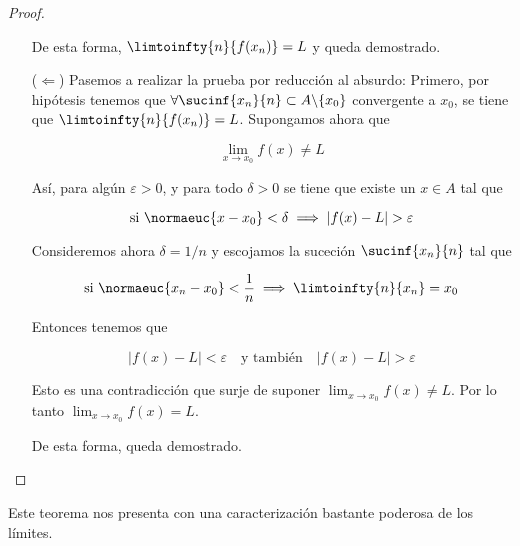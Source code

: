 \begin{proof}
\begin{itemize}
        De esta forma, $\limtoinfty{n}{f(x_n)} = L$ y queda demostrado.
        
        \item[($\Leftarrow$)] Pasemos a realizar la prueba por reducción al absurdo: Primero, por hipótesis tenemos que $\forall \sucinf{x_n}{n} \subset A \backslash \{x_0\}$ convergente a $x_0$, se tiene que $\limtoinfty{n}{f(x_n)} = L$. Supongamos ahora que
        
        \[
        \lim_{x \to x_0} f(x) \neq L
        \]
        
        Así, para algún $\varepsilon > 0$, y para todo $\delta > 0$ se tiene que existe un $x \in A$ tal que
        
        \[
        \text{si $\normaeuc{x - x_0} < \delta$} \implies |f(x) - L| > \varepsilon
        \]
        
        Consideremos ahora $\delta = 1/n$ y escojamos la suceción $\sucinf{x_n}{n}$ tal que
        
        \[
        \text{si $\normaeuc{x_n - x_0} < \frac{1}{n}$} \implies \limtoinfty{n}{x_n} = x_0
        \]
        
        Entonces tenemos que
        
        \[
        |f(x) - L| < \varepsilon \quad \text{y también} \quad |f(x) - L| > \varepsilon
        \]
        
        Esto es una contradicción que surje de suponer $\lim_{x \to x_0} f(x) \neq L$. Por lo tanto $\lim_{x \to x_0} f(x) = L$.
        
        De esta forma, queda demostrado.
    \end{itemize}
\end{proof}

Este teorema nos presenta con una caracterización bastante poderosa de los límites.